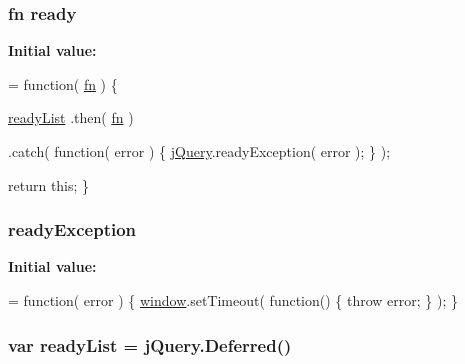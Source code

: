 \subsubsection[{\texorpdfstring{ready}{ready}}]{ {\bf fn} ready}\hypertarget{jquery-3_82_81_8js_a1b01c09fc8c62ba97ab88b57672adaf4}{}\label{jquery-3_82_81_8js_a1b01c09fc8c62ba97ab88b57672adaf4}
{\bfseries Initial value\+:}
\begin{DoxyCode}
= \textcolor{keyword}{function}( \hyperlink{jquery-3_82_81_8js_acef6bdaf6b9b20fdcca1ea86f0902c3b}{fn} ) \{

    \hyperlink{jquery-3_82_81_8js_a1ea568fbc6e7a700059e4becf41031f0}{readyList}
        .then( \hyperlink{jquery-3_82_81_8js_acef6bdaf6b9b20fdcca1ea86f0902c3b}{fn} )

        
        
        
        .catch( \textcolor{keyword}{function}( error ) \{
            \hyperlink{jquery-3_82_81_8js_a609525712f1102566c2b03866ceb2bba}{jQuery}.readyException( error );
        \} );

    \textcolor{keywordflow}{return} \textcolor{keyword}{this};
\}
\end{DoxyCode}
\subsubsection[{\texorpdfstring{ready\+Exception}{readyException}}]{ ready\+Exception}\hypertarget{jquery-3_82_81_8js_abe612c7bb71d321cd8404496c4ffd6bd}{}\label{jquery-3_82_81_8js_abe612c7bb71d321cd8404496c4ffd6bd}
{\bfseries Initial value\+:}
\begin{DoxyCode}
= \textcolor{keyword}{function}( error ) \{
    \hyperlink{jquery-3_82_81_8js_ad55530ae1e5978df8e721017c1fc8466}{window}.setTimeout( \textcolor{keyword}{function}() \{
        \textcolor{keywordflow}{throw} error;
    \} );
\}
\end{DoxyCode}
\subsubsection[{\texorpdfstring{ready\+List}{readyList}}]{\setlength{\rightskip}{0pt plus 5cm}var ready\+List = j\+Query.\+Deferred()}\hypertarget{jquery-3_82_81_8js_a1ea568fbc6e7a700059e4becf41031f0}{}\label{jquery-3_82_81_8js_a1ea568fbc6e7a700059e4becf41031f0}
